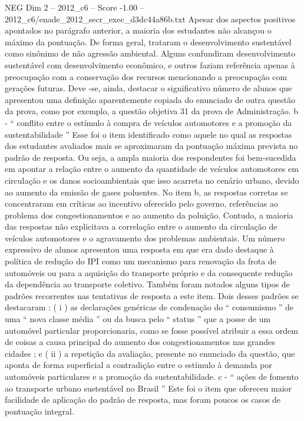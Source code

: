 \begin{textsample}{NEG Dim 2 – 2012\_c6 – Score -1.00 – 2012\_c6/enade\_2012\_secr\_exec\_d3dc44a86b.txt}
Apesar dos aspectos positivos apontados no parágrafo anterior, a maioria dos estudantes não alcançou o máximo da pontuação.
De forma geral, trataram o desenvolvimento sustentável como sinônimo de não agressão ambiental.
Alguns confundiram desenvolvimento sustentável com desenvolvimento econômico, e outros faziam referência apenas à preocupação com a conservação dos recursos mencionando a preocupação com gerações futuras.
Deve -se, ainda, destacar o significativo número de alunos que apresentou uma definição aparentemente copiada do enunciado de outra questão da prova, como por exemplo, a questão objetiva 31 da prova de Administração. b - “ conflito entre o estímulo à compra de veículos automotores e a promoção da sustentabilidade ” Esse foi o item identificado como aquele no qual as respostas dos estudantes avaliados mais se aproximaram da pontuação máxima prevista no padrão de resposta.
Ou seja, a ampla maioria dos respondentes foi bem-sucedida em apontar a relação entre o aumento da quantidade de veículos automotores em circulação e os danos socioambientais que isso acarreta no cenário urbano, devido ao aumento da emissão de gases poluentes.
No item b, as respostas corretas se concentraram em críticas ao incentivo oferecido pelo governo, referências ao problema dos congestionamentos e ao aumento da poluição.
Contudo, a maioria das respostas não explicitava a correlação entre o aumento da circulação de veículos automotores e o agravamento dos problemas ambientais.
Um número expressivo de alunos apresentou uma resposta em que era dado destaque à política de redução do IPI como um mecanismo para renovação da frota de automóveis ou para a aquisição do transporte próprio e da consequente redução da dependência ao transporte coletivo.
Também foram notados alguns tipos de padrões recorrentes nas tentativas de resposta a este item.
Dois desses padrões se destacaram : ( i ) as declarações genéricas de condenação do “ consumismo ” de uma “ nova classe média ” ou da busca pelo “ status ” que a posse de um automóvel particular proporcionaria, como se fosse possível atribuir a essa ordem de coisas a causa principal do aumento dos congestionamentos nas grandes cidades ; e ( ii ) a repetição da avaliação, presente no enunciado da questão, que aponta de forma superficial a contradição entre o estímulo à demanda por automóveis particulares e a promoção da sustentabilidade. c - “ ações de fomento ao transporte urbano sustentável no Brasil ” Este foi o item que ofereceu maior facilidade de aplicação do padrão de resposta, mas foram poucos os casos de pontuação integral.

\end{textsample}
